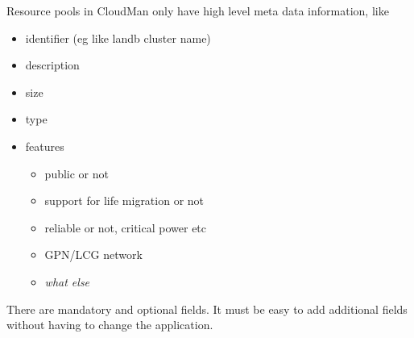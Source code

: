 Resource pools in CloudMan only have high level meta data information, like
\begin{itemize}
\item identifier (eg like landb cluster name)
\item description
\item size 
\item type
\item features 
 \begin{itemize}
 \item public or not
 \item support for life migration or not
 \item reliable or not, critical power etc 
 \item GPN/LCG network
 \item {\it what else }
 \end{itemize}
\end{itemize}
There are mandatory and optional fields. 
It must be easy to add additional fields without having to 
change the application.
 

